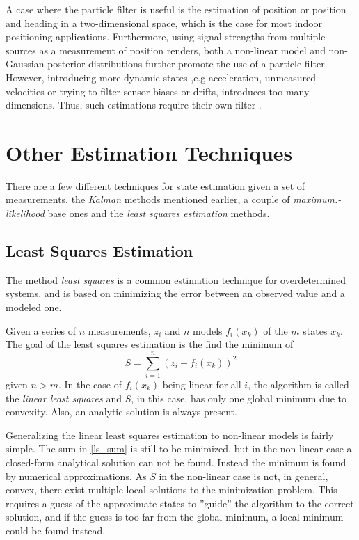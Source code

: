 \documentclass{LTHthesis}
\begin{document}
A case where the particle filter is useful is the estimation of position or position and heading in a two-dimensional space, which is the case for most indoor positioning applications. Furthermore, using signal strengths from multiple sources as a measurement of position renders, both a non-linear model and non-Gaussian posterior distributions further promote the use of a particle filter. However, introducing more dynamic states ,e.g acceleration, unmeasured velocities or trying to filter sensor biases or drifts, introduces too many dimensions. Thus, such estimations require their own filter \cite{gson12}.        
%
\section{Other Estimation Techniques}
\label{sec:oet}
%
There are a few different techniques for state estimation given a set of measurements, the \emph{Kalman} methods mentioned earlier, a couple of \emph{maximum.-likelihood} base ones and the \emph{least squares estimation} methods. \cite{gson12}
%
 \subsection{Least Squares Estimation}
%
The method \emph{least squares} is a common estimation technique for overdetermined systems, and is based on minimizing the error between an observed value and a modeled one. 

Given a series of $n$ measurements, $z_i$ and $n$ models $f_i(x_k)$ of the $m$ states $x_k$. The goal of the least squares estimation is the find the minimum of
%
\begin{equation}
S = \sum_{i=1}^n(z_i-f_i(x_k))^2
\label{ls_sum}
\end{equation}
%
given $n>m$. In the case of $f_i(x_k)$ being linear for all $i$, the algorithm is called the \emph{linear least squares} and $S$, in this case, has only one global minimum due to convexity. Also, an analytic solution is always present.

Generalizing the linear least squares estimation to non-linear models is fairly simple. The sum in \ref{ls_sum} is still to be minimized, but in the non-linear case a closed-form analytical solution can not be found. Instead the minimum is found by numerical approximations. As $S$ in the non-linear case is not, in general, convex, there exist multiple local solutions to the minimization problem. This requires a guess of the approximate states to ''guide'' the algorithm to the correct solution, and if the guess is too far from the global minimum, a local minimum could be found instead.     
\end{document}
